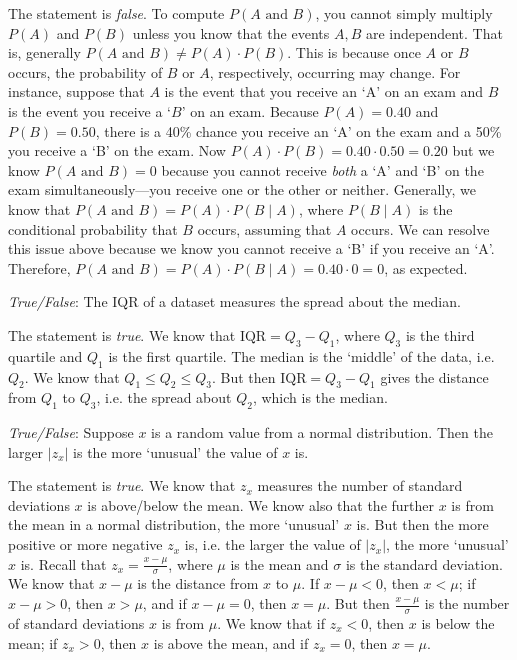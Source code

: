 \documentclass[11pt,letterpaper]{article}
\begin{document}
\sol The statement is \textit{false}. To compute $P(A \text{ and } B)$, you cannot simply multiply $P(A)$ and $P(B)$ unless you know that the events $A, B$ are independent. That is, generally $P(A \text{ and } B) \neq P(A) \cdot P(B)$. This is because once $A$ or $B$ occurs, the probability of $B$ or $A$, respectively, occurring may change. For instance, suppose that $A$ is the event that you receive an `A' on an exam and $B$ is the event you receive a `$B$' on an exam. Because $P(A)= 0.40$ and $P(B)= 0.50$, there is a 40\% chance you receive an `A' on the exam and a 50\% you receive a `B' on the exam. Now $P(A) \cdot P(B)= 0.40 \cdot 0.50= 0.20$ but we know $P(A \text{ and } B)= 0$ because you cannot receive \textit{both} a `A' and `B' on the exam simultaneously---you receive one or the other or neither. Generally, we know that $P(A \text{ and } B)= P(A) \cdot P(B \;|\; A)$, where $P(B \;|\; A)$ is the conditional probability that $B$ occurs, assuming that $A$ occurs. We can resolve this issue above because we know you cannot receive a `B' if you receive an `A'. Therefore, $P(A \text{ and } B)= P(A) \cdot P(B \;|\; A)= 0.40 \cdot 0= 0$, as expected. \pvspace{1.3cm}



\quizsol \textit{True/False}: The IQR of a dataset measures the spread about the median. \pspace

\sol The statement is \textit{true}. We know that $\text{IQR}= Q_3 - Q_1$, where $Q_3$ is the third quartile and $Q_1$ is the first quartile. The median is the `middle' of the data, i.e. $Q_2$. We know that $Q_1 \leq Q_2 \leq Q_3$. But then $\text{IQR}= Q_3 - Q_1$ gives the distance from $Q_1$ to $Q_3$, i.e. the spread about $Q_2$, which is the median. \pvspace{1.3cm}



\quizsol \textit{True/False}: Suppose $x$ is a random value from a normal distribution. Then the larger $|z_x|$ is the more `unusual' the value of $x$ is. \pspace

\sol The statement is \textit{true}. We know that $z_x$ measures the number of standard deviations $x$ is above/below the mean. We know also that the further $x$ is from the mean in a normal distribution, the more `unusual' $x$ is. But then the more positive or more negative $z_x$ is, i.e. the larger the value of $|z_x|$, the more `unusual' $x$ is. Recall that $z_x= \frac{x - \mu}{\sigma}$, where $\mu$ is the mean and $\sigma$ is the standard deviation. We know that $x - \mu$ is the distance from $x$ to $\mu$. If $x - \mu < 0$, then $x < \mu$; if $x - \mu > 0$, then $x > \mu$, and if $x - \mu= 0$, then $x= \mu$. But then $\frac{x - \mu}{\sigma}$ is the number of standard deviations $x$ is from $\mu$. We know that if $z_x < 0$, then $x$ is below the mean; if $z_x > 0$, then $x$ is above the mean, and if $z_x= 0$, then $x= \mu$. \pvspace{1.3cm}
\end{document}
